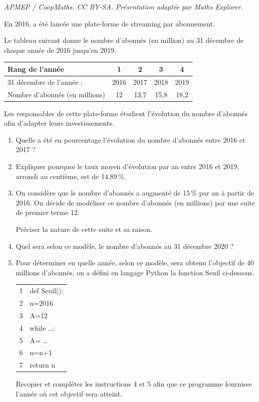 \documentclass[10pt]{article}
\begin{document}
\noindent\textit{APMEP / CoopMaths. CC BY-SA. Présentation adaptée par Maths Explorer.}\par\medskip
\medskip

En 2016, a été lancée une plate-forme de streaming par abonnement.

Le tableau suivant donne le nombre d'abonnés (en million) au 31 décembre de
chaque année de 2016 jusqu'en 2019.
\begin{center}
\begin{tabular}[]{|m{4.85cm}|*{4}{c|}}
\hline
Rang de l'année &1& 2& 3 &4\\\hline
31 décembre de l'année :& 2016& 2017& 2018& 2019\\\hline
Nombre d'abonnés (en millions) &12& 13,7& 15,8& 18,2\\ \hline
\end{tabular}
\end{center}

Les responsables de cette plate-forme étudient l'évolution du nombre d'abonnés afin
d'adapter leurs investissements.

\medskip

\begin{enumerate}
\item  Quelle a été en pourcentage l'évolution du nombre d'abonnés entre 2016 et
2017 ?
\item Expliquer pourquoi le taux moyen d'évolution par an entre 2016 et 2019,
arrondi au centième, est de 14,89\,\%.
\item On considère que le nombre d'abonnés a augmenté de 15\,\% par an à partir de
2016. On décide de modéliser ce nombre d'abonnés (en millions) par une
suite de premier terme 12.

Préciser la nature de cette suite et sa raison.
\item Quel sera selon ce modèle, le nombre d'abonnés au 31 décembre 2020 ?
\item Pour déterminer en quelle année, selon ce modèle, sera obtenu l'objectif de
40 millions d'abonnés, on a défini en langage Python la fonction Seuil ci-dessous.

\begin{center}
\begin{tabular}[]{|c|l|}
\hline
1& def Seuil():\\
2&  \hspace{1em}n=2016\\
3&  \hspace{1em}A=12\\
4&  \hspace{1em}while \ldots :\\
5&  \hspace{1em}\phantom{w}A= \dots\\
6&  \hspace{1em}\phantom{w}n=n+1\\
7&  \hspace{1em}return n\\
\hline
\end{tabular}
\end{center}
Recopier et compléter les instructions 4 et 5 afin que ce programme fournisse
l'année où cet objectif sera atteint.
\end{enumerate}
\end{document}
